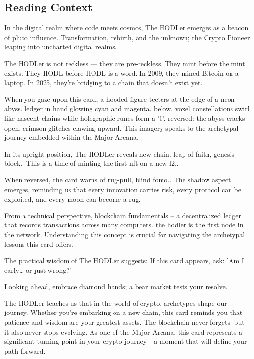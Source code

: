 \documentclass[11pt,oneside]{book}
\begin{document}
\begin{minipage}[t]{0.55\textwidth}
  \subsection*{Reading Context}
  In the digital realm where code meets cosmos, The HODLer emerges as a beacon of pluto influence. Transformation, rebirth, and the unknown; the Crypto Pioneer leaping into uncharted digital realms.

  The HODLer is not reckless — they are pre-reckless. They mint before the mint exists. They HODL before HODL is a word. In 2009, they mined Bitcoin on a laptop. In 2025, they're bridging to a chain that doesn't exist yet.

  When you gaze upon this card, a hooded figure teeters at the edge of a neon abyss, ledger in hand glowing cyan and magenta. below, voxel constellations swirl like nascent chains while holographic runes form a '0'. reversed: the abyss cracks open, crimson glitches clawing upward. This imagery speaks to the archetypal journey embedded within the Major Arcana.

  In its upright position, The HODLer reveals new chain, leap of faith, genesis block.. This is a time of minting the first nft on a new l2..

  When reversed, the card warns of rug-pull, blind fomo.. The shadow aspect emerges, reminding us that every innovation carries risk, every protocol can be exploited, and every moon can become a rug.

  From a technical perspective, blockchain fundamentals – a decentralized ledger that records transactions across many computers. the hodler is the first node in the network. Understanding this concept is crucial for navigating the archetypal lessons this card offers.

  The practical wisdom of The HODLer suggests: If this card appears, ask: 'Am I early… or just wrong?'

  Looking ahead, embrace diamond hands; a bear market tests your resolve.

  The HODLer teaches us that in the world of crypto, archetypes shape our journey. Whether you're embarking on a new chain, this card reminds you that patience and wisdom are your greatest assets. The blockchain never forgets, but it also never stops evolving. As one of the Major Arcana, this card represents a significant turning point in your crypto journey—a moment that will define your path forward.

\end{minipage}
\end{document}
